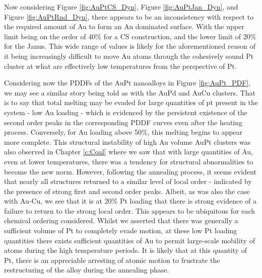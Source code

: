 Now considering Figure \ref{fig:AuPtCS_Dyn}, Figure \ref{fig:AuPtJan_Dyn}, and Figure \ref{fig:AuPtRnd_Dyn}, there appears to be an inconsistency with respect to the required amount of Au to form an Au dominated surface. With the upper limit being on the order of 40\% for a CS construction, and the lower limit of 20\% for the Janus. This wide range of values is likely for the aforementioned reason of it being increasingly difficult to move Au atoms through the cohesively sound Pt cluster at what are effectively low temperatures from the perspective of Pt.

Considering now the PDDFs of the AuPt nanoalloys in Figure \ref{fig:AuPt_PDF}, we may see a similar story being told as with the AuPd and AuCu clusters. That is to say that total melting may be evaded for large quantities of pt present in the system - low Au loading - which is evidenced by the persistent existence of the second order peaks in the corresponding PDDF curves even after the heating process. Conversely, for Au loading above 50\%, this melting begins to appear more complete. This structural instability of high Au volume AuPt clusters was also observed in Chapter \ref{c:Coal} where we saw that with large quantities of Au, even at lower temperatures, there was a tendency for structural abnormalities to become the new norm. However, following the annealing process, it seems evident that nearly all structures returned to a similar level of local order - indicated by the presence of strong first and second order peaks. Albeit, as was also the case with Au-Cu, we see that it is at 20\% Pt loading that there is strong evidence of a failure to return to the strong local order. This appears to be ubiquitous for each chemical ordering considered. Whilst we asserted that there was generally a sufficient volume of Pt to completely evade motion, at these low Pt loading quantities there exists sufficient quantities of Au to permit large-scale mobility of atoms during the high temperature periods. It is likely that at this quantity of Pt, there is an appreciable arresting of atomic motion to frustrate the restructuring of the alloy during the annealing phase.


